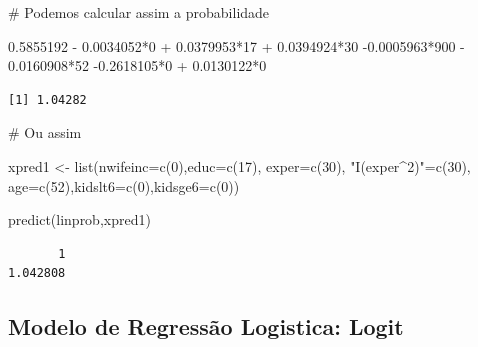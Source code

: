 \documentclass[
  letterpaper,
  DIV=11,
  numbers=noendperiod]{scrreprt}
\newenvironment{Shaded}{\begin{snugshade}}{\end{snugshade}}
\newcommand{\AttributeTok}[1]{\textcolor[rgb]{0.40,0.45,0.13}{#1}}
\newcommand{\CommentTok}[1]{\textcolor[rgb]{0.37,0.37,0.37}{#1}}
\newcommand{\DecValTok}[1]{\textcolor[rgb]{0.68,0.00,0.00}{#1}}
\newcommand{\FloatTok}[1]{\textcolor[rgb]{0.68,0.00,0.00}{#1}}
\newcommand{\FunctionTok}[1]{\textcolor[rgb]{0.28,0.35,0.67}{#1}}
\newcommand{\NormalTok}[1]{\textcolor[rgb]{0.00,0.23,0.31}{#1}}
\newcommand{\OtherTok}[1]{\textcolor[rgb]{0.00,0.23,0.31}{#1}}
\newcommand{\SpecialCharTok}[1]{\textcolor[rgb]{0.37,0.37,0.37}{#1}}
\newcommand{\StringTok}[1]{\textcolor[rgb]{0.13,0.47,0.30}{#1}}
\begin{document}
\begin{Shaded}
\begin{Highlighting}[]
\CommentTok{\# Podemos calcular assim a probabilidade }

\FloatTok{0.5855192} \SpecialCharTok{{-}} \FloatTok{0.0034052}\SpecialCharTok{*}\DecValTok{0}  \SpecialCharTok{+} \FloatTok{0.0379953}\SpecialCharTok{*}\DecValTok{17}  \SpecialCharTok{+} \FloatTok{0.0394924}\SpecialCharTok{*}\DecValTok{30}  \SpecialCharTok{{-}}\FloatTok{0.0005963}\SpecialCharTok{*}\DecValTok{900}  \SpecialCharTok{{-}} \FloatTok{0.0160908}\SpecialCharTok{*}\DecValTok{52}  \SpecialCharTok{{-}}\FloatTok{0.2618105}\SpecialCharTok{*}\DecValTok{0}  \SpecialCharTok{+} \FloatTok{0.0130122}\SpecialCharTok{*}\DecValTok{0}
\end{Highlighting}
\end{Shaded}

\begin{verbatim}
[1] 1.04282
\end{verbatim}

\begin{Shaded}
\begin{Highlighting}[]
\CommentTok{\# Ou assim}

\NormalTok{xpred1 }\OtherTok{\textless{}{-}} \FunctionTok{list}\NormalTok{(}\AttributeTok{nwifeinc=}\FunctionTok{c}\NormalTok{(}\DecValTok{0}\NormalTok{),}\AttributeTok{educ=}\FunctionTok{c}\NormalTok{(}\DecValTok{17}\NormalTok{), }\AttributeTok{exper=}\FunctionTok{c}\NormalTok{(}\DecValTok{30}\NormalTok{), }\StringTok{"I(exper\^{}2)"}\OtherTok{=}\FunctionTok{c}\NormalTok{(}\DecValTok{30}\NormalTok{),}
 \AttributeTok{age=}\FunctionTok{c}\NormalTok{(}\DecValTok{52}\NormalTok{),}\AttributeTok{kidslt6=}\FunctionTok{c}\NormalTok{(}\DecValTok{0}\NormalTok{),}\AttributeTok{kidsge6=}\FunctionTok{c}\NormalTok{(}\DecValTok{0}\NormalTok{))}

\FunctionTok{predict}\NormalTok{(linprob,xpred1)}
\end{Highlighting}
\end{Shaded}

\begin{verbatim}
       1 
1.042808 
\end{verbatim}

\subsection{Modelo de Regressão Logistica:
Logit}\label{modelo-de-regressuxe3o-logistica-logit}
\end{document}
